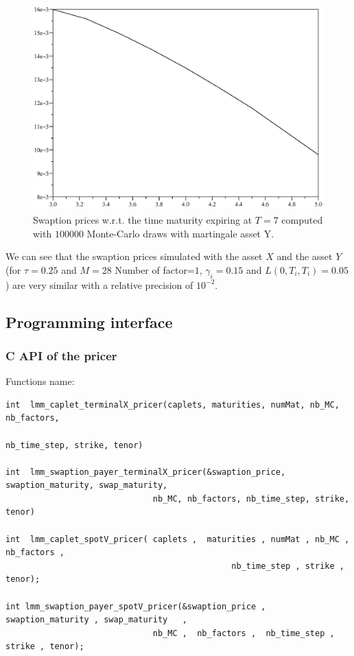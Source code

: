\begin{figure}[H]
\begin{center}
\includegraphics[height=8cm]{./figures/swptY.eps}
\caption{Swaption prices w.r.t. the time maturity  expiring at $T=7$
  computed with $100 000$ Monte-Carlo draws  with martingale asset Y.} 
\label{swptY}
\end{center}
\end{figure}
We can see that the swaption prices simulated with the asset $X$ and the asset $Y$
(for $\tau=0.25$ and $M=28$ Number of factor=$1$, $\gamma_i=0.15$ and
$L(0,T_i,T_i)=0.05$) are very similar with a relative precision of $10^{-2}$.


\subsection{Programming interface}


\subsubsection{C API of the pricer}

Functions name: 
\small{
\begin{verbatim}
int  lmm_caplet_terminalX_pricer(caplets, maturities, numMat, nb_MC, nb_factors, 
                                                           nb_time_step, strike, tenor)

int  lmm_swaption_payer_terminalX_pricer(&swaption_price, swaption_maturity, swap_maturity, 
					          nb_MC, nb_factors, nb_time_step, strike, tenor)

int  lmm_caplet_spotV_pricer( caplets ,  maturities , numMat , nb_MC , nb_factors , 
			                                  nb_time_step , strike ,  tenor);

int lmm_swaption_payer_spotV_pricer(&swaption_price ,  swaption_maturity , swap_maturity   , 
	               			  nb_MC ,  nb_factors ,  nb_time_step ,  strike , tenor);
\end{verbatim}
}

